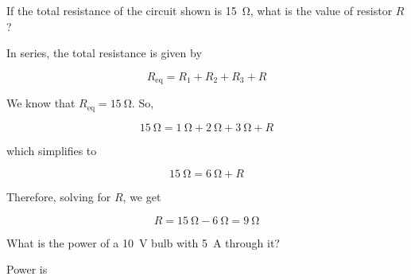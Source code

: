 \documentclass[answers]{exam}
\begin{document}
\begin{questions}

\question
If the total resistance of the circuit shown is \SI{15}{\ohm}, what is the value of resistor $R$?

\begin{center}
\end{center}

\begin{solutionorbox}[3.0cm]
In series, the total resistance is given by

\begin{equation*}
    R_\mathrm{eq} = R_1 + R_2 + R_3 + R
\end{equation*}

We know that $R_\mathrm{eq} = \SI{15}{\ohm}$. So,

\begin{equation*}
    \SI{15}{\ohm} = \SI{1}{\ohm} + \SI{2}{\ohm} + \SI{3}{\ohm} + R
\end{equation*}

which simplifies to

\begin{equation*}
    \SI{15}{\ohm} = \SI{6}{\ohm} + R
\end{equation*}

Therefore, solving for $R$, we get

\begin{equation*}
    R = \SI{15}{\ohm} - \SI{6}{\ohm} = \boxed{\SI{9}{\ohm}}
\end{equation*}
\end{solutionorbox}


\question
What is the power of a \SI{10}{V} bulb with \SI{5}{A} through it?

\begin{solutionorbox}[2.5cm]
Power is


\end{solutionorbox}
\end{questions}
\end{document}
